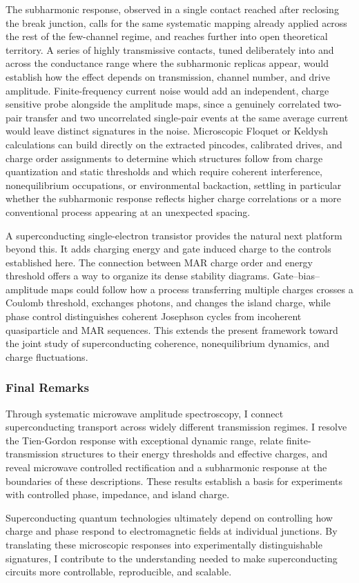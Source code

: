         The subharmonic response, observed in a single contact reached after reclosing the break junction, calls for the same systematic mapping already applied across the rest of the few-channel regime, and reaches further into open theoretical territory. A series of highly transmissive contacts, tuned deliberately into and across the conductance range where the subharmonic replicas appear, would establish how the effect depends on transmission, channel number, and drive amplitude. Finite-frequency current noise would add an independent, charge sensitive probe alongside the amplitude maps, since a genuinely correlated two-pair transfer and two uncorrelated single-pair events at the same average current would leave distinct signatures in the noise. Microscopic Floquet or Keldysh calculations can build directly on the extracted pincodes, calibrated drives, and charge order assignments to determine which structures follow from charge quantization and static thresholds and which require coherent interference, nonequilibrium occupations, or environmental backaction, settling in particular whether the subharmonic response reflects higher charge correlations or a more conventional process appearing at an unexpected spacing.

        A superconducting single-electron transistor provides the natural next platform beyond this. It adds charging energy and gate induced charge to the controls established here. The connection between MAR charge order and energy threshold offers a way to organize its dense stability diagrams. Gate--bias--amplitude maps could follow how a process transferring multiple charges crosses a Coulomb threshold, exchanges photons, and changes the island charge, while phase control distinguishes coherent Josephson cycles from incoherent quasiparticle and MAR sequences. This extends the present framework toward the joint study of superconducting coherence, nonequilibrium dynamics, and charge fluctuations.

    \subsubsection*{Final Remarks}

        Through systematic microwave amplitude spectroscopy, I connect superconducting transport across widely different transmission regimes. I resolve the Tien-Gordon response with exceptional dynamic range, relate finite-transmission structures to their energy thresholds and effective charges, and reveal microwave controlled rectification and a subharmonic response at the boundaries of these descriptions. These results establish a basis for experiments with controlled phase, impedance, and island charge.

        Superconducting quantum technologies ultimately depend on controlling how charge and phase respond to electromagnetic fields at individual junctions. By translating these microscopic responses into experimentally distinguishable signatures, I contribute to the understanding needed to make superconducting circuits more controllable, reproducible, and scalable.
